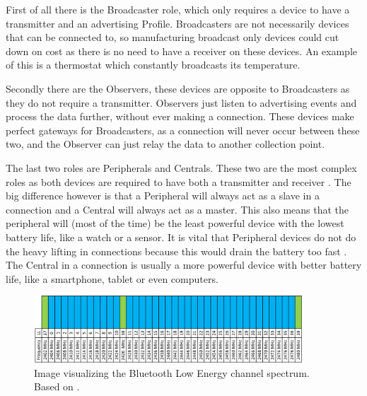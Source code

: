\documentclass[pdftex,a4paper,12pt,twoside]{report}
\begin{document}
First of all there is the Broadcaster role, which only requires a device to have a transmitter and an advertising Profile. Broadcasters are not necessarily devices that can be connected to, so manufacturing broadcast only devices could cut down on cost as there is no need to have a receiver on these devices. An example of this is a thermostat which constantly broadcasts its temperature.

Secondly there are the Observers, these devices are opposite to Broadcasters as they do not require a transmitter. Observers just listen to advertising events and process the data further, without ever making a connection. These devices make perfect gateways for Broadcasters, as a connection will never occur between these two, and the Observer can just relay the data to another collection point.

The last two roles are Peripherals and Centrals. These two are the most complex roles as both devices are required to have both a transmitter and receiver \citep{Townsend2014}. The big difference however is that a Peripheral will always act as a slave in a connection and a Central will always act as a master. This also means that the peripheral will (most of the time) be the least powerful device with the lowest battery life, like a watch or a sensor. It is vital that Peripheral devices do not do the heavy lifting in connections because this would drain the battery too fast \citep{Townsend2014}. The Central in a connection is usually a more powerful device with better battery life, like a smartphone, tablet or even computers.

\begin{figure}[h]
    \centering
    \includegraphics[width=0.9\textwidth]{img/channelmap.png}
    \caption[Image visualizing the Bluetooth Low Energy channel spectrum]{Image visualizing the Bluetooth Low Energy channel spectrum. Based on \cite{Townsend2014}.}
    \label{fig:channelmap}
\end{figure}
\end{document}
